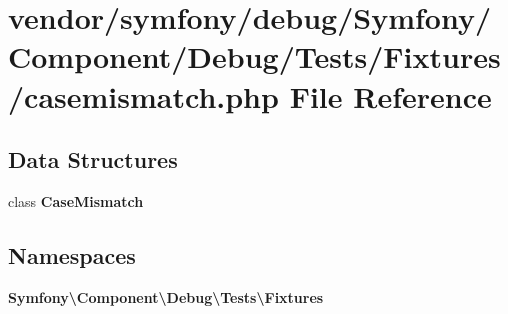 \section{vendor/symfony/debug/\+Symfony/\+Component/\+Debug/\+Tests/\+Fixtures/casemismatch.php File Reference}
\label{casemismatch_8php}
\subsection*{Data Structures}
\begin{DoxyCompactItemize}
\item 
class {\bf Case\+Mismatch}
\end{DoxyCompactItemize}
\subsection*{Namespaces}
\begin{DoxyCompactItemize}
\item 
 {\bf Symfony\textbackslash{}\+Component\textbackslash{}\+Debug\textbackslash{}\+Tests\textbackslash{}\+Fixtures}
\end{DoxyCompactItemize}
